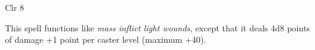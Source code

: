 
\begin{description*}
\item[Level:] Clr 8
\end{description*}

This spell functions like \textit{mass inflict light wounds}, except that it deals
4d8 points of damage +1 point per caster level (maximum +40).